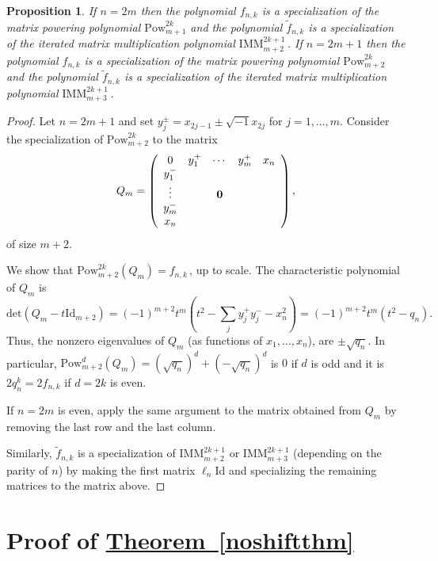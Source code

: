 \documentclass[11pt]{article}
\numberwithin{equation}{section}
\newtheorem{proposition}[theorem]{Proposition}
\theoremstyle{definition}
\theoremstyle{plain}
\newcommand{\expref}[2]{\hyperref[#2]{#1~\ref{#2}}}
\newcommand{\vvirg}{ , \dots , }
\providecommand{\textsum}{}
\renewcommand{\textsum}{{\textstyle \sum}}
\renewcommand{\tilde}[1]{\widetilde{#1}}
\newcommand{\Id}{\mathrm{Id}}
\newcommand{\Pow}{\mathrm{Pow}}
\renewcommand{\det}{\mathrm{det}}
\newcommand{\IMM}{\mathrm{IMM}}
\begin{document}
%
%
%

%
%
%
%
%
%
%
%

\begin{proposition}\label{prop: IMM specializes to fnk}
If $n = 2m$ then the polynomial $f_{n,k}$ is a specialization of
the matrix powering polynomial $\Pow^{2k}_{m+1}$ 
and the polynomial $\tilde{f}_{n,k}$ 
is a specialization of the iterated matrix multiplication
polynomial $\IMM^{2k+1}_{m+2}$\,.
If $n = 2m+1$ then the polynomial $f_{n,k}$ is a specialization of
the matrix powering polynomial $\Pow^{2k}_{m+2}$
and the polynomial $\tilde{f}_{n,k}$
is a specialization of the iterated matrix multiplication
polynomial $\IMM^{2k+1}_{m+3}$\,.
\end{proposition}
%
%
%
%
%
%
%
%
\begin{proof}
Let $n = 2m+1$ and set $y_j^\pm = x_{2j-1} \pm \sqrt{-1} x_{2j}$ for $j = 1 \vvirg m$. Consider the specialization of $\Pow^{2k}_{m+2}$ to the matrix
\[
 Q_m = \left( \begin{array}{ccccc}
  0 & y_1^+ & \cdots & y_m^+ & x_n \\
  y_1^- & & & & \\
  \vdots &  &\bf0 & &\\
  y_m^- & & & & \\
  x_n & & & & 
 \end{array}\right),
\]
of size $m+2$.

We show that $\Pow^{2k}_{m+2}(Q_m) = f_{n,k}$\,, up to scale. The characteristic polynomial of $Q_m$ is
\[
 \det(Q_m - t\Id_{m+2}) = (-1)^{m+2} t^{m}\left( t^2 - \textsum_j y_j^+ y_j^- - x_n^2\right) = (-1)^{m+2} t^{m}\left( t^2 - q_n\right).
\]
Thus, the nonzero eigenvalues of $Q_m$ (as functions of $x_1\vvirg x_n$),  are $\pm \sqrt{q_n}$. In particular, $\Pow^{d}_{m+2}(Q_m) = (\sqrt{q_n})^d + (-\sqrt{q_n})^d$ is $0$ if $d$ is odd and it is $2 q_n^k = 2f_{n,k}$ if $d = 2k$ is even.

If $n = 2m$ is even, apply the same argument to the matrix obtained from $Q_m$ by removing the last row and the last column.

Similarly, $\tilde f_{n,k}$ is a specialization of $\IMM^{2k+1}_{m+2}$ or $\IMM^{2k+1}_{m+3}$ (depending on the parity of $n$) by making the first matrix $\ell_n\Id$ and specializing the remaining matrices to the matrix above.
\end{proof}


\section{Proof of \expref{Theorem}{noshiftthm}}
\end{document}
